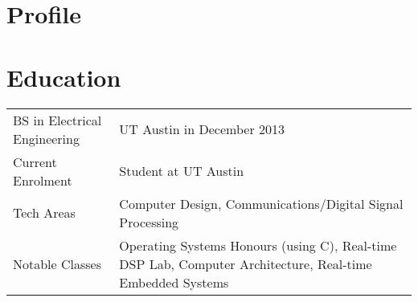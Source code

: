 \documentclass[letterpaper,12pt]{resume}
\begin{document}
\let\olditemize\itemize
\renewcommand{\itemize}{
  \olditemize
  \setlength{\itemsep}{1pt}
  \setlength{\parskip}{0pt}
  \setlength{\parsep}{0pt}
}

\author{James Brisson}
\maketitle

\section{Profile}

\section{Education}
\noindent
\begin{tabular}{p{}p{}}
  BS in Electrical Engineering&
  UT Austin in December 2013\\
  \noalign{\smallskip}
  Current Enrolment&
  Student at UT Austin\\
  \noalign{\smallskip}
  Tech Areas&
  Computer Design, Communications/Digital Signal Processing\\
  \noalign{\smallskip}
  Notable Classes&
  Operating Systems Honours (using C), Real-time DSP Lab, Computer Architecture, Real-time Embedded Systems\\
\end{tabular}
\end{document}
